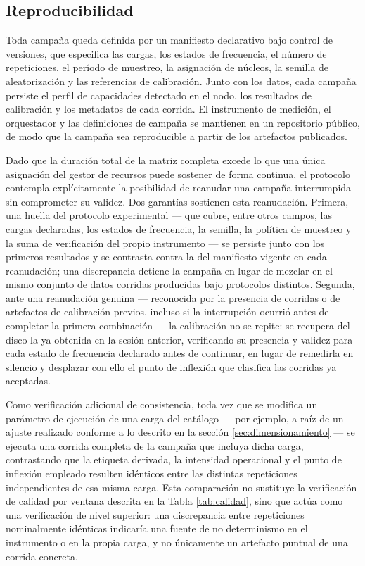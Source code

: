 \documentclass[12pt,oneside,spanish]{book}
\begin{document}
\subsection{Reproducibilidad}
\label{sec:reproducibilidad}

Toda campaña queda definida por un manifiesto declarativo bajo control de versiones, que especifica las cargas, los estados de frecuencia, el número de repeticiones, el período de muestreo, la asignación de núcleos, la semilla de aleatorización y las referencias de calibración. Junto con los datos, cada campaña persiste el perfil de capacidades detectado en el nodo, los resultados de calibración y los metadatos de cada corrida. El instrumento de medición, el orquestador y las definiciones de campaña se mantienen en un repositorio público, de modo que la campaña sea reproducible a partir de los artefactos publicados.

Dado que la duración total de la matriz completa excede lo que una única asignación del gestor de recursos puede sostener de forma continua, el protocolo contempla explícitamente la posibilidad de reanudar una campaña interrumpida sin comprometer su validez. Dos garantías sostienen esta reanudación. Primera, una huella del protocolo experimental --- que cubre, entre otros campos, las cargas declaradas, los estados de frecuencia, la semilla, la política de muestreo y la suma de verificación del propio instrumento --- se persiste junto con los primeros resultados y se contrasta contra la del manifiesto vigente en cada reanudación; una discrepancia detiene la campaña en lugar de mezclar en el mismo conjunto de datos corridas producidas bajo protocolos distintos. Segunda, ante una reanudación genuina --- reconocida por la presencia de corridas o de artefactos de calibración previos, incluso si la interrupción ocurrió antes de completar la primera combinación --- la calibración no se repite: se recupera del disco la ya obtenida en la sesión anterior, verificando su presencia y validez para cada estado de frecuencia declarado antes de continuar, en lugar de remedirla en silencio y desplazar con ello el punto de inflexión que clasifica las corridas ya aceptadas.

Como verificación adicional de consistencia, toda vez que se modifica un parámetro de ejecución de una carga del catálogo --- por ejemplo, a raíz de un ajuste realizado conforme a lo descrito en la sección \ref{sec:dimensionamiento} --- se ejecuta una corrida completa de la campaña que incluya dicha carga, contrastando que la etiqueta derivada, la intensidad operacional y el punto de inflexión empleado resulten idénticos entre las distintas repeticiones independientes de esa misma carga. Esta comparación no sustituye la verificación de calidad por ventana descrita en la Tabla \ref{tab:calidad}, sino que actúa como una verificación de nivel superior: una discrepancia entre repeticiones nominalmente idénticas indicaría una fuente de no determinismo en el instrumento o en la propia carga, y no únicamente un artefacto puntual de una corrida concreta.
\end{document}
